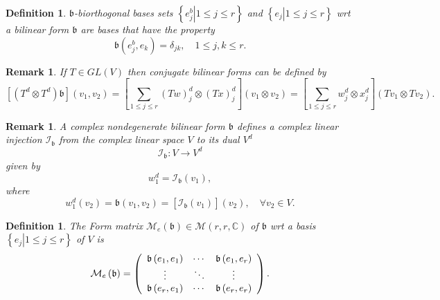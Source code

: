 \documentclass[aps,preprint]{revtex4}%
\newtheorem{definition}[theorem]{Definition}
\newtheorem{remark}[theorem]{Remark}
\begin{document}
\begin{definition}
$\mathfrak{b}$-\emph{biorthogonal} bases sets $\left\{  \left.  e_{j}%
^{b}\right\vert 1\leq j\leq r\right\}  $ and $\left\{  \left.  e_{j}%
\right\vert 1\leq j\leq r\right\}  $ wrt a bilinear form $\mathfrak{b}$ are
bases that have the property
\begin{equation}
\mathfrak{b}\left(  e_{j}^{b},e_{k}\right)  =\delta_{jk},\quad1\leq j,k\leq r.
\end{equation}

\end{definition}

\begin{remark}
If $T\in GL\left(  V\right)  $ then conjugate bilinear forms can be defined
by
\begin{equation}
\left[  \left(  T^{d}\otimes T^{d}\right)  \mathfrak{b}\right]  \left(
v_{1},v_{2}\right)  =\left[  \sum_{1\leq j\leq r}\left(  Tw\right)  _{j}%
^{d}\otimes\left(  Tx\right)  _{j}^{d}\right]  \left(  v_{1}\otimes
v_{2}\right)  =\left[  \sum_{1\leq j\leq r}w_{j}^{d}\otimes x_{j}^{d}\right]
\left(  Tv_{1}\otimes Tv_{2}\right)  .
\end{equation}

\end{remark}

\begin{remark}
A complex \emph{nondegenerate} bilinear form $\mathfrak{b}$ defines a complex
linear injection $\mathcal{I}_{\mathfrak{b}}$ from the complex linear space
$V$ to its dual $V^{d}$
\begin{equation}
\mathcal{I}_{\mathfrak{b}}:V\rightarrow V^{d}%
\end{equation}
given by%
\begin{equation}
w_{1}^{d}=\mathcal{I}_{\mathfrak{b}}\left(  v_{1}\right)  ,
\end{equation}
where%
\begin{equation}
w_{1}^{d}\left(  v_{2}\right)  =\mathfrak{b}\left(  v_{1},v_{2}\right)
=\left[  \mathcal{I}_{\mathfrak{b}}\left(  v_{1}\right)  \right]  \left(
v_{2}\right)  ,\quad\forall v_{2}\in V.
\end{equation}

\end{remark}

\begin{definition}
The \emph{Form matrix} $\mathcal{M}_{e}\left(  \mathfrak{b}\right)
\in\mathcal{M}\left(  r,r,\mathbb{C}\right)  $ of $\mathfrak{b}$ wrt a basis
$\left\{  \left.  e_{j}\right\vert 1\leq j\leq r\right\}  $ of $V$ is
\begin{equation}
\mathcal{M}_{e}\left(  \mathfrak{b}\right)  =\left(
\begin{array}
[c]{ccc}%
\mathfrak{b}\left(  e_{1},e_{1}\right)  & \cdots & \mathfrak{b}\left(
e_{1},e_{r}\right) \\
\vdots & \ddots & \vdots\\
\mathfrak{b}\left(  e_{r},e_{1}\right)  & \cdots & \mathfrak{b}\left(
e_{r},e_{r}\right)
\end{array}
\right)  .
\end{equation}

\end{definition}
\end{document}
